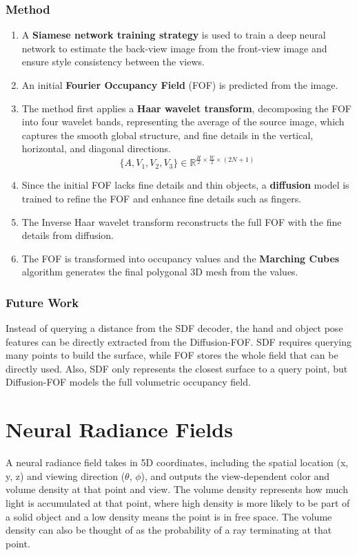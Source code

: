 \documentclass{article}
\begin{document}
\subsubsection*{Method}
\begin{enumerate}
    \item A \textbf{Siamese network training strategy} is used to train a deep neural network to estimate the back-view image from the front-view image and ensure style consistency between the views.
    \item An initial \textbf{Fourier Occupancy Field} (FOF) is predicted from the image.
    \item The method first applies a \textbf{Haar wavelet transform}, decomposing the FOF into four wavelet bands, representing the average of the source image, which captures the smooth global structure, and fine details in the vertical, horizontal, and diagonal directions.
    \[\{A, V_1, V_2, V_3\}\in\mathbb{R}^{\frac{H}{2}\times\frac{W}{2}\times(2N+1)}\]
    \item Since the initial FOF lacks fine details and thin objects, a \textbf{diffusion} model is trained to refine the FOF and enhance fine details such as fingers.
    \item The Inverse Haar wavelet transform reconstructs the full FOF with the fine details from diffusion.
    \item The FOF is transformed into occupancy values and the \textbf{Marching Cubes} algorithm generates the final polygonal 3D mesh from the values.
\end{enumerate}


\subsubsection*{Future Work}

Instead of querying a distance from the SDF decoder, the hand and object pose features can be directly extracted from the Diffusion-FOF. SDF requires querying many points to build the surface, while FOF stores the whole field that can be directly used. Also, SDF only represents the closest surface to a query point, but Diffusion-FOF models the full volumetric occupancy field.

\section*{Neural Radiance Fields}

A neural radiance field takes in 5D coordinates, including the spatial location (x, y, z) and viewing direction ($\theta$, $\phi$), and outputs the view-dependent color and volume density at that point and view. The volume density represents how much light is accumulated at that point, where high density is more likely to be part of a solid object and a low density means the point is in free space. The volume density can also be thought of as the probability of a ray terminating at that point.
\end{document}

